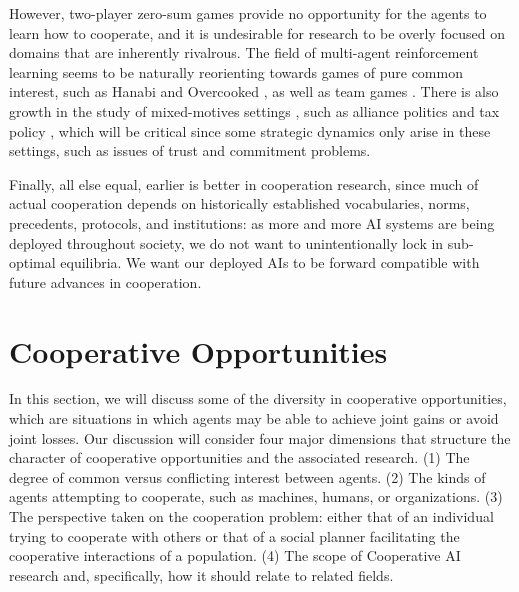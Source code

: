 \documentclass[11pt, a4paper, logo, onecolumn, nonumbering]{deepmind}
\begin{document}
However, two-player zero-sum games provide no opportunity for the agents to learn how to cooperate, and it is undesirable for research to be overly focused on domains that are inherently rivalrous. 
The field of multi-agent reinforcement learning seems to be naturally reorienting towards games of pure common interest, such as Hanabi \cite{bard2020hanabi} and Overcooked \cite{carroll2019utility}, as well as team games \cite{jaderberg2019human}. There is also growth in the study of  mixed-motives settings \cite{baker2020emergent}, such as alliance politics  \cite{hughes2020learning, anthony2020learning, paquette2019press} and tax policy \cite{zheng2020ai}, which will be critical since some strategic dynamics only arise in these settings, such as issues of trust and commitment problems. 

Finally, all else equal, earlier is better in cooperation research, since much of actual cooperation depends on historically established vocabularies, norms, precedents,  protocols, and institutions: as more and more AI systems are being deployed throughout society, we do not want to unintentionally lock in sub-optimal equilibria. We want our deployed AIs to be forward compatible with future advances in cooperation.



\section{Cooperative Opportunities}
\label{section:environments}
\label{section:opportunities}

In this section, we will discuss some of the diversity in cooperative opportunities, which are situations in which agents may be able to achieve joint gains or avoid joint losses. Our discussion will consider four major dimensions that structure the character of cooperative opportunities and the associated research. (1) The degree of common versus conflicting interest between agents. (2) The kinds of agents attempting to cooperate, such as machines, humans, or organizations. (3) The perspective taken on the cooperation problem: either that of an individual trying to cooperate with others or that of a social planner facilitating the cooperative interactions of a population. (4) The scope of Cooperative AI research and, specifically, how it should relate to related fields. 
\end{document}
